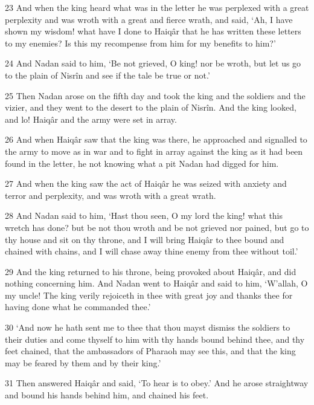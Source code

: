 \par 23 And when the king heard what was in the letter he was perplexed with a great perplexity and was wroth with a great and fierce wrath, and said, ‘Ah, I have shown my wisdom! what have I done to Haiqâr that he has written these letters to my enemies? Is this my recompense from him for my benefits to him?’

\par 24 And Nadan said to him, ‘Be not grieved, O king! nor be wroth, but let us go to the plain of Nisrîn and see if the tale be true or not.’

\par 25 Then Nadan arose on the fifth day and took the king and the soldiers and the vizier, and they went to the desert to the plain of Nisrîn. And the king looked, and lo! Haiqâr and the army were set in array.

\par 26 And when Haiqâr saw that the king was there, he approached and signalled to the army to move as in war and to fight in array against the king as it had been found in the letter, he not knowing what a pit Nadan had digged for him.

\par 27 And when the king saw the act of Haiqâr he was seized with anxiety and terror and perplexity, and was wroth with a great wrath.

\par 28 And Nadan said to him, ‘Hast thou seen, O my lord the king! what this wretch has done? but be not thou wroth and be not grieved nor pained, but go to thy house and sit on thy throne, and I will bring Haiqâr to thee bound and chained with chains, and I will chase away thine enemy from thee without toil.’

\par 29 And the king returned to his throne, being provoked about Haiqâr, and did nothing concerning him. And Nadan went to Haiqâr and said to him, ‘W’allah, O my uncle! The king verily rejoiceth in thee with great joy and thanks thee for having done what he commanded thee.’

\par 30 ‘And now he hath sent me to thee that thou mayst dismiss the soldiers to their duties and come thyself to him with thy hands bound behind thee, and thy feet chained, that the ambassadors of Pharaoh may see this, and that the king may be feared by them and by their king.’

\par 31 Then answered Haiqâr and said, ‘To hear is to obey.’ And he arose straightway and bound his hands behind him, and chained his feet.

